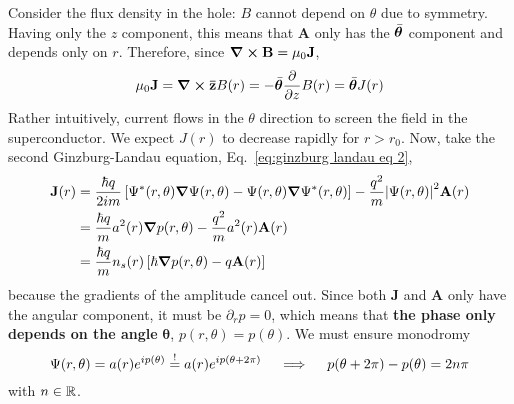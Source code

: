 Consider the flux density in the hole: $B$ cannot depend on $\theta$ due to symmetry. Having only the $z$ component, this means that $\mathbf{A}$ only has the $\Bar{\bm\theta}$ component and depends only on $r$. Therefore, since $\curl\mathbf{B}=\mu_0\mathbf{J}$,
\[
    \mu_0\mathbf{J} = \curl\mathbf{\bar{z}}B(r) = - \Bar{\bm{\theta}} \pdv{}{z} B(r) = \Bar{\bm{\theta}} J(r)
\]
Rather intuitively, current flows in the $\theta$ direction to screen the field in the superconductor. We expect $J(r)$ to decrease rapidly for $r>r_0$. Now, take the second Ginzburg-Landau equation, Eq.~\eqref{eq:ginzburg landau eq 2},
\[
\begin{aligned}
    \mathbf{J}(r) &= \frac{\hbar q}{2im} \left[{ \Psi^* (r,\theta) \grad \Psi (r,\theta) - \Psi (r,\theta) \grad \Psi^* (r,\theta) }\right] - \frac{q^2}{m} \abs{\Psi (r,\theta)}^2 \mathbf{A} (r) \\
    &= \frac{\hbar q}{m} a^2(r) \grad p(r,\theta) - \frac{q^2}{m} a^2(r) \mathbf{A} (r) \\
    &= \frac{\hbar q}{m} n_s(r) \left[{ \hbar \grad p(r,\theta) - q \mathbf{A}(r) }\right]
\end{aligned}
\]
because the gradients of the amplitude cancel out. Since both $\mathbf{J}$ and $\mathbf{A}$ only have the angular component, it must be $\partial_r p = 0$, which means that \textbf{the phase only depends on the angle} $\bm{\theta}$, $p(r,\theta)=p(\theta)$. We must ensure monodromy
\[
    \Psi(r,\theta) = a(r) e^{ip(\theta)} \stackrel{!}{=} a(r) e^{ip(\theta + 2\pi)}
    \quad\implies\quad
    p(\theta + 2\pi) - p(\theta) = 2n\pi
\]
with $n\in\mathbb{R}$.

